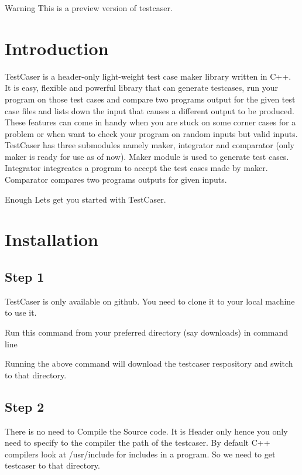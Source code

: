 \begin{DoxyWarning}{Warning}
This is a preview version of testcaser. 
\end{DoxyWarning}
\hypertarget{index_sec_intro}{}\section{Introduction}\label{index_sec_intro}
Test\+Caser is a header-\/only light-\/weight test case maker library written in C++. It is easy, flexible and powerful library that can generate testcases, run your program on those test cases and compare two program\textquotesingle{}s output for the given test case files and lists down the input that causes a different output to be produced. These features can come in handy when you are stuck on some corner cases for a problem or when want to check your program on random inputs but valid inputs. Test\+Caser has three submodules namely maker, integrator and comparator (only maker is ready for use as of now). Maker module is used to generate test cases. Integrator integreates a program to accept the test cases made by maker. Comparator compares two program\textquotesingle{}s outputs for given inputs.

Enough Let\textquotesingle{}s get you started with Test\+Caser.\hypertarget{index_sec_install}{}\section{Installation}\label{index_sec_install}
\hypertarget{index_step1}{}\subsection{Step 1}\label{index_step1}
Test\+Caser is only available on github. You need to clone it to your local machine to use it.

Run this command from your preferred directory (say downloads) in command line 
\begin{DoxyCode}{0}
\end{DoxyCode}
 Running the above command will download the testcaser respository and switch to that directory.\hypertarget{index_step2}{}\subsection{Step 2}\label{index_step2}
There is no need to Compile the Source code. It is Header only hence you only need to specify to the compiler the path of the testcaser. By default C++ compilers look at /usr/include for includes in a program. So we need to get testcaser to that directory.

